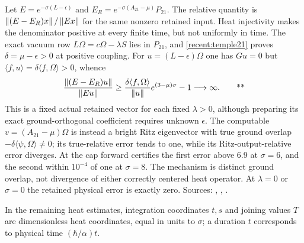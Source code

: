 Let $E=e^{-\sigma(L-\epsilon)}$ and
$E_R=e^{-\sigma(A_{21}-\mu)}P_{21}$.  The relative quantity is
$\left\lVert (E-E_R)x\right\rVert/\left\lVert Ex\right\rVert$ for the same nonzero retained input.  Heat injectivity
makes the denominator positive at every finite time, but not uniformly in time.
The exact vacuum row $L\Omega=c\Omega-\lambda S$ lies in $P_{21}$, and
\eqref{recent:temple21} proves $\delta=\mu-\epsilon>0$ at positive coupling.
For $u=(L-\epsilon)\Omega$ one has $Gu=0$ but
$\langle f,u\rangle=\delta\langle f,\Omega\rangle>0$, whence
\begin{equation}
 \frac{\left\lVert (E-E_R)u\right\rVert}{\left\lVert Eu\right\rVert}
 \ge\frac{\delta\langle f,\Omega\rangle}{\left\lVert u\right\rVert}
 e^{(3-\mu)\sigma}-1\longrightarrow\infty.\qquad\text{**}
 \label{recent:relative-obstruction}
\end{equation}
This is a fixed actual retained vector for each fixed $\lambda>0$, although
preparing its exact ground-orthogonal coefficient requires unknown $\epsilon$.
The computable $v=(A_{21}-\mu)\Omega$ is instead a bright Ritz eigenvector with
true ground overlap $-\delta\langle\psi,\Omega\rangle\ne0$; its true-relative
error tends to one, while its Ritz-output-relative error diverges.
At the cap forward certifies the first error above 6.9 at $\sigma=6$, and the
second within $10^{-4}$ of one at $\sigma=8$.  The mechanism is distinct ground
overlap, not divergence of either correctly centered heat operator.  At
$\lambda=0$ or $\sigma=0$ the retained physical error is exactly zero.
Sources: ,
,
.

In the remaining heat estimates, integration coordinates $t,s$ and joining values $T$ are dimensionless heat coordinates, equal in units to $\sigma$; a duration $t$ corresponds to physical time $(\hbar/\alpha)t$.

